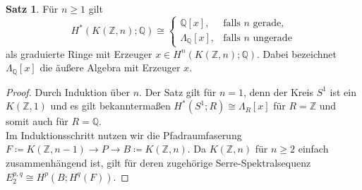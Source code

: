\documentclass[11pt, a4paper, german]{article}
\theoremstyle{definition}
\newtheorem*{satz}{Satz}
\theoremstyle{remark}
\newcommand{\Z}{\mathbb{Z}} %
\newcommand{\Q}{\mathbb{Q}} %
\begin{document}
\begin{satz}
  Für $n \geq 1$ gilt
  \[
    H^*(K(\Z, n); \Q) \cong \begin{cases}
      \Q[x], & \text{falls $n$ gerade}, \\
      \Lambda_\Q[x], & \text{falls $n$ ungerade}
    \end{cases}
  \]
  als graduierte Ringe mit Erzeuger $x \in H^n(K(\Z, n); \Q)$.
  Dabei bezeichnet $\Lambda_\Q[x]$ die äußere Algebra mit Erzeuger $x$.
\end{satz}

\begin{proof}
  Durch Induktion über $n$.
  Der Satz gilt für $n = 1$, denn der Kreis $S^1$ ist ein $K(\Z, 1)$ und es gilt bekanntermaßen $H^*(S^1; R) \cong \Lambda_R[x]$ für $R = \Z$ und somit auch für $R = \Q$. \\
  Im Induktionsschritt nutzen wir die Pfadraumfaserung $F \coloneqq K(\Z, n{-}1) \to P \to B \coloneqq K(\Z, n)$. Da $K(\Z, n)$ für $n \geq 2$ einfach zusammenhängend ist, gilt für deren zugehörige Serre-Spektralsequenz
  $E_2^{p,q} \cong H^p(B; H^q(F))$.

  \vspace{0.5cm}


\end{proof}
\end{document}
